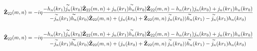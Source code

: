       \begin{equation}
            \hat{\mathbf{Z}}_{22}(m,n) = -i\eta
            \dfrac{-h_{n} ( kr_{1} ) \overset{\thicksim}{j_{n}}  ( kr_{0} ) \hat{\mathbf{Z}}_{22}(m,n)+j_{n} ( kr_{1} ) \overset{\thicksim}{h_{n}}  ( kr_{0} ) \hat{\mathbf{Z}}_{22}(m,n)-h_{n} ( kr_{1} ) j_{n} ( kr_{0} ) +j_{n} ( kr_{1} ) h_{n} ( kr_{0} ) }{-\overset{\thicksim}{j_{n}}  ( kr_{1} ) \overset{\thicksim}{h_{n}}  ( kr_{0} ) \hat{\mathbf{Z}}_{22}(m,n)+ ( j_{n} ( kr_{0} ) +\hat{\mathbf{Z}}_{22}(m,n)\,\overset{\thicksim}{j_{n}}  ( kr_{0} )  ) \overset{\thicksim}{h_{n}}  ( kr_{1} ) -\overset{\thicksim}{j_{n}}  ( kr_{1} ) h_{n} ( kr_{0} ) }
      \end{equation}

      \begin{equation}
            \hat{\mathbf{Z}}_{22}(m,n) = -i\eta
            \dfrac{-h_{n} ( kr_{1} ) \overset{\thicksim}{j_{n}}  ( kr_{0} ) \hat{\mathbf{Z}}_{22}(m,n)+j_{n} ( kr_{1} ) \overset{\thicksim}{h_{n}}  ( kr_{0} ) \hat{\mathbf{Z}}_{22}(m,n)-h_{n} ( kr_{1} ) j_{n} ( kr_{0} ) +j_{n} ( kr_{1} ) h_{n} ( kr_{0} ) }{-\overset{\thicksim}{j_{n}}  ( kr_{1} ) \overset{\thicksim}{h_{n}}  ( kr_{0} ) \hat{\mathbf{Z}}_{22}(m,n)+ ( j_{n} ( kr_{0} ) +\hat{\mathbf{Z}}_{22}(m,n)\,\overset{\thicksim}{j_{n}}  ( kr_{0} )  ) \overset{\thicksim}{h_{n}}  ( kr_{1} ) -\overset{\thicksim}{j_{n}}  ( kr_{1} ) h_{n} ( kr_{0} ) }
      \end{equation}